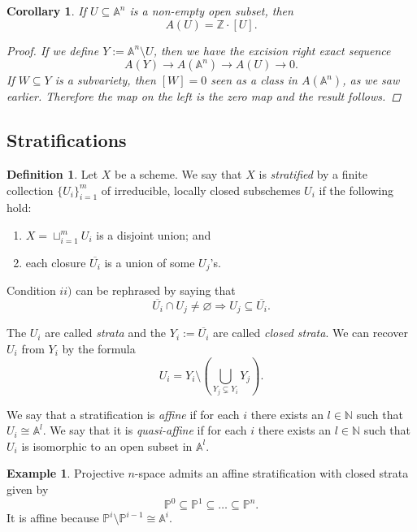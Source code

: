 \documentclass[12pt,a4paper]{amsart}
\theoremstyle{plain}
\newtheorem{cor}[thm]{Corollary}
\theoremstyle{definition}
\newtheorem{defn}[thm]{Definition}
\newtheorem{exmp}[thm]{Example}
\theoremstyle{remark}
\begin{document}
\begin{cor}
    If $U\subseteq \mathbb{A}^{n}$ is a non-empty open subset, then
    \[ A(U)=\mathbb{Z}\cdot [U]. \]
    \begin{proof}
	If we define $Y:=\mathbb{A}^{n}\setminus U$, then we have the excision right exact sequence
	\[ A(Y)\to A(\mathbb{A}^{n})\to A(U)\to 0. \]
	If $W\subseteq Y$ is a subvariety, then $[W]=0$ seen as a class in $A(\mathbb{A}^{n})$, as we saw earlier.
	Therefore the map on the left is the zero map and the result follows.
    \end{proof}
\end{cor}

\subsection{Stratifications \cite[\S 1.3.5]{eh16}}

\begin{defn}
    Let $X$ be a scheme.
    We say that $X$ is \textit{stratified} by a finite collection $\{ U_{i}\}_{i=1}^{m}$ of irreducible, locally closed subschemes $U_{i}$ if the following hold:
    \begin{enumerate}[label=\roman*)]
	\item $X=\sqcup_{i=1}^{m} U_{i}$ is a disjoint union; and
	\item each closure $\overline{U_{i}}$ is a union of some $U_{j}$'s.
    \end{enumerate}
\end{defn}

Condition $ii)$ can be rephrased by saying that
\[ \overline{U_{i}}\cap U_{j}\neq \varnothing \Rightarrow U_{j}\subseteq \overline{U_{i}}. \]

The $U_{i}$ are called \textit{strata} and the $Y_{i}:=\overline{U_{i}}$ are called \textit{closed strata}.
We can recover $U_{i}$ from $Y_{i}$ by the formula
\[ U_{i}=Y_{i}\setminus \left(\bigcup_{Y_{j}\subsetneq Y_{i}} Y_{j}\right). \]

We say that a stratification is \textit{affine} if for each $i$ there exists an $l\in \mathbb{N}$ such that $U_{i}\cong \mathbb{A}^{l}$.
We say that it is \textit{quasi-affine} if for each $i$ there exists an $l\in \mathbb{N}$ such that $U_{i}$ is isomorphic to an open subset in $\mathbb{A}^{l}$.

\begin{exmp}
    Projective $n$-space admits an affine stratification with closed strata given by
    \[ \mathbb{P}^{0}\subseteq \mathbb{P}^{1}\subseteq \ldots \subseteq \mathbb{P}^{n}. \]
    It is affine because $\mathbb{P}^{i}\setminus \mathbb{P}^{i-1}\cong \mathbb{A}^{i}$.
\end{exmp}
\end{document}
